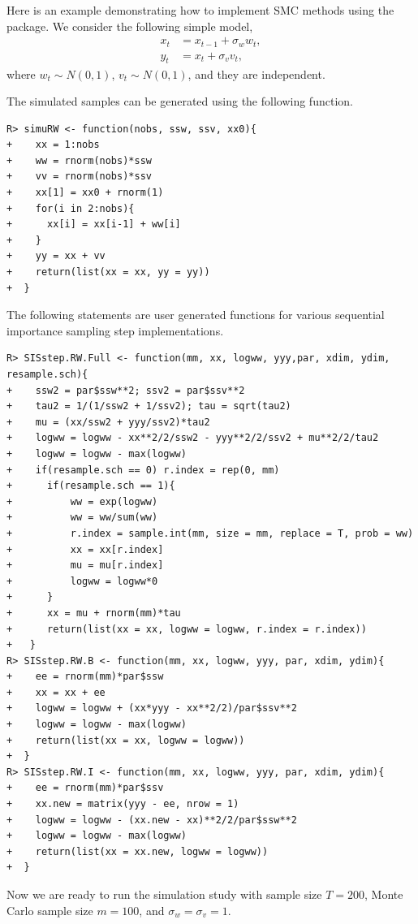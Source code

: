 Here is an example demonstrating how to implement SMC methods using the  package.
We consider the following simple model,
\begin{align*}
x_t&=x_{t-1}+\sigma_w w_t,\\
y_t&=x_t+\sigma_v v_t,
\end{align*}
where $w_t \sim N(0,1)$, $v_t\sim N(0,1)$, and they are independent.

The simulated samples can be generated using the following function.

\begin{verbatim}
R> simuRW <- function(nobs, ssw, ssv, xx0){
+    xx = 1:nobs
+    ww = rnorm(nobs)*ssw
+    vv = rnorm(nobs)*ssv
+    xx[1] = xx0 + rnorm(1)
+    for(i in 2:nobs){
+      xx[i] = xx[i-1] + ww[i]
+    }
+    yy = xx + vv
+    return(list(xx = xx, yy = yy))
+  }
\end{verbatim}

The following statements are user generated functions for various sequential importance sampling
 step implementations.

\begin{verbatim}
R> SISstep.RW.Full <- function(mm, xx, logww, yyy,par, xdim, ydim, resample.sch){
+    ssw2 = par$ssw**2; ssv2 = par$ssv**2
+    tau2 = 1/(1/ssw2 + 1/ssv2); tau = sqrt(tau2)
+    mu = (xx/ssw2 + yyy/ssv2)*tau2
+    logww = logww - xx**2/2/ssw2 - yyy**2/2/ssv2 + mu**2/2/tau2
+    logww = logww - max(logww)
+    if(resample.sch == 0) r.index = rep(0, mm)
+      if(resample.sch == 1){
+          ww = exp(logww)
+          ww = ww/sum(ww)
+          r.index = sample.int(mm, size = mm, replace = T, prob = ww)
+          xx = xx[r.index]
+          mu = mu[r.index]
+          logww = logww*0
+      }
+      xx = mu + rnorm(mm)*tau
+      return(list(xx = xx, logww = logww, r.index = r.index))
+   }
R> SISstep.RW.B <- function(mm, xx, logww, yyy, par, xdim, ydim){
+    ee = rnorm(mm)*par$ssw
+    xx = xx + ee
+    logww = logww + (xx*yyy - xx**2/2)/par$ssv**2
+    logww = logww - max(logww)
+    return(list(xx = xx, logww = logww))
+  }
R> SISstep.RW.I <- function(mm, xx, logww, yyy, par, xdim, ydim){
+    ee = rnorm(mm)*par$ssv
+    xx.new = matrix(yyy - ee, nrow = 1)
+    logww = logww - (xx.new - xx)**2/2/par$ssw**2
+    logww = logww - max(logww)
+    return(list(xx = xx.new, logww = logww))
+  }
\end{verbatim}

Now we are ready to run the simulation study with sample size $T=200$, Monte Carlo sample size $m=100$, and $\sigma_w=\sigma_v=1$.

